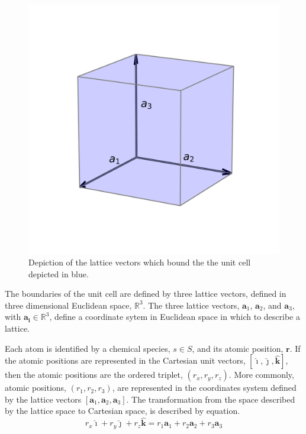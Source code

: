 \begin{figure}[ht]
	\centering
  \includegraphics{chapter3/unit_cell}
  \caption{Depiction of the lattice vectors which bound the the unit cell depicted in blue.}
  \label{fig:unit_cell}
\end{figure}

The boundaries of the unit cell are defined by three lattice vectors, defined in three dimensional Euclidean space, $\mathbb{R}^3$.
The three lattice vectors, $\bm{a}_1$, $\bm{a}_2$, and $\bm{a}_3$, with $\bm{a_i}\in\mathbb{R}^3$, define a coordinate sytem in Euclidean space in which to describe a lattice.

Each atom is identified by a chemical species, $s\in S$, and its atomic position, $\bm{r}$.
If the atomic positions are represented in the Cartesian unit vectors, $[\hat{\bm{\imath}},\hat{\bm{\jmath}},\hat{\bm{k}}]$, then the atomic positions are the ordered triplet, $(r_x,r_y,r_z)$.
More commonly, atomic positions, $(r_1,r_2,r_3)$, are represented in the coordinates system defined by the lattice vectors $[\bm{a}_1,\bm{a}_2,\bm{a}_3]$.  The transformation from the space described by the lattice space to Cartesian space, is described by equation.
\begin{equation}
	\label{eq:fractional_vs_cartesian_coordinates}
	r_x \hat{\bm{\imath}} + r_y \hat{\bm{\jmath}} + r_z \hat{\bm{k}}
	=
	r_1 \bm{a}_1 + r_2 \bm{a}_2 + r_3 \bm{a}_3
\end{equation}

